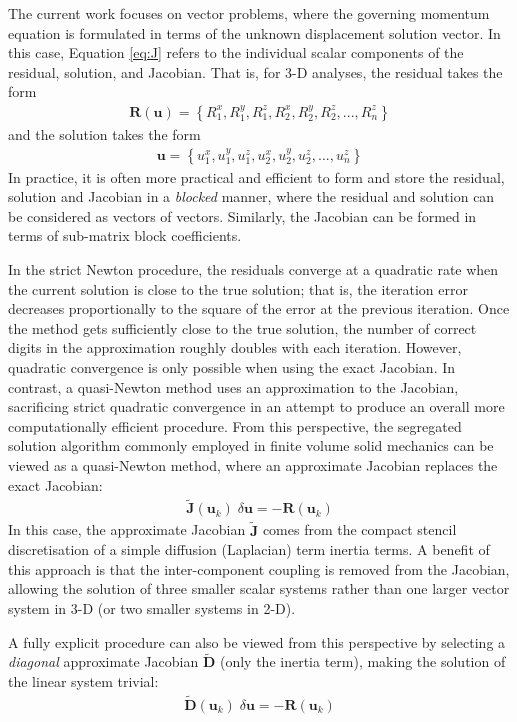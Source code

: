 \documentclass[sn-mathphys,Numbered]{sn-jnl}%
\newcommand{\bb}{\boldsymbol}
\begin{document}
The current work focuses on vector problems, where the governing momentum equation is formulated in terms of the unknown displacement solution vector.
In this case, Equation \ref{eq:J} refers to the individual scalar components of the residual, solution, and Jacobian.
That is, for 3-D analyses, the residual takes the form
\begin{eqnarray}
	\bb{R}(\bb{u}) = \left\{ R_1^x, R_1^y, R_1^z, R_2^x, R_2^y, R_2^z, ..., R_n^z \right\}
\end{eqnarray}
and the solution takes the form
\begin{eqnarray}
	\bb{u} = \left\{ u_1^x, u_1^y, u_1^z, u_2^x, u_2^y, u_2^z, ..., u_n^z \right\}
\end{eqnarray}
In practice, it is often more practical and efficient to form and store the residual, solution and Jacobian in a \emph{blocked} manner, where the residual and solution can be considered as vectors of vectors.
Similarly, the Jacobian can be formed in terms of sub-matrix block coefficients.

In the strict Newton procedure, the residuals converge at a quadratic rate when the current solution is close to the true solution; that is, the iteration error decreases proportionally to the square of the error at the previous iteration.
Once the method gets sufficiently close to the true solution, the number of correct digits in the approximation roughly doubles with each iteration. 
However, quadratic convergence is only possible when using the exact Jacobian.
In contrast, a quasi-Newton method uses an approximation to the Jacobian, sacrificing strict quadratic convergence in an attempt to produce an overall more computationally efficient procedure.
From this perspective, the segregated solution algorithm commonly employed in finite volume solid mechanics can be viewed as a quasi-Newton method, where an approximate Jacobian replaces the exact Jacobian: 
\begin{eqnarray} \label{eq:Seg}
    \bb{\tilde{J}}(\bb{u}_k) \;\delta \bb{u} = -\bb{R}(\bb{u}_k)
\end{eqnarray}
In this case, the approximate Jacobian $\bb{\tilde{J}}$ comes from the compact stencil discretisation of a simple diffusion (Laplacian) term inertia terms.
A benefit of this approach is that the inter-component coupling is removed from the Jacobian, allowing the solution of three smaller scalar systems rather than one larger vector system in 3-D (or two smaller systems in 2-D).

A fully explicit procedure can also be viewed from this perspective by selecting a \emph{diagonal} approximate Jacobian $\bb{\tilde{D}}$ (only the inertia term), making the solution of the linear system trivial:
\begin{eqnarray} \label{eq:exp}
    \bb{\tilde{D}}(\bb{u}_k) \;\delta \bb{u} = -\bb{R}(\bb{u}_k)
\end{eqnarray}
\end{document}
